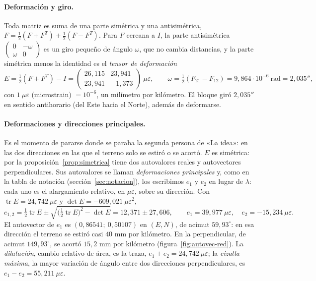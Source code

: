 \paragraph{Deformación y giro.} Toda matriz es suma de una parte simétrica y una
antisimétrica, \(F=\tfrac12(F+F^T)+\tfrac12(F-F^T)\). Para \(F\) cercana a \(I\), la parte
antisimétrica \(\left(\begin{smallmatrix}0&-\omega\\\omega&0\end{smallmatrix}\right)\) es un
giro pequeño de ángulo \(\omega\), que no cambia distancias, y la parte simétrica menos la
identidad es el \emph{tensor de deformación}
\[
  E=\tfrac12(F+F^T)-I=\begin{pmatrix}26{,}115&23{,}941\\23{,}941&-1{,}373\end{pmatrix}\ \mu\varepsilon,
  \qquad
  \omega=\tfrac12(F_{21}-F_{12})=9{,}864\cdot10^{-6}\ \text{rad}=2{,}035'' ,
\]
con \(1\ \mu\varepsilon\) (microstrain) \(=10^{-6}\), un milímetro por kilómetro. El bloque
giró \(2{,}035''\) en sentido antihorario (del Este hacia el Norte), además de deformarse.

\paragraph{Deformaciones y direcciones principales.} Es el momento de pararse donde se paraba
la segunda persona de «La idea»: en las dos direcciones en las que el terreno solo se estiró o
se acortó. \(E\) es simétrica: por la
proposición~\ref{prop:simetrica} tiene dos autovalores reales y autovectores perpendiculares.
Sus autovalores se llaman \emph{deformaciones principales} y, como en la tabla de notación
(sección~\ref{sec:notacion}), los escribimos \(e_1\) y \(e_2\) en lugar de \(\lambda\):
cada uno es el alargamiento relativo, en \(\mu\varepsilon\), sobre su dirección.
Con \(\operatorname{tr}E=24{,}742\ \mu\varepsilon\) y \(\det E=-609{,}021\ \mu\varepsilon^2\),
\[
  e_{1,2}=\tfrac12\operatorname{tr}E\pm\sqrt{\bigl(\tfrac12\operatorname{tr}E\bigr)^2-\det E}
  =12{,}371\pm27{,}606 ,
  \qquad
  e_1=39{,}977\ \mu\varepsilon,\quad e_2=-15{,}234\ \mu\varepsilon .
\]
El autovector de \(e_1\) es \((0{,}86541;\ 0{,}50107)\) en \((E,N)\), de acimut
\(59{,}93^\circ\): en esa dirección el terreno se estiró casi \(40\) mm por kilómetro. En la
perpendicular, de acimut \(149{,}93^\circ\), se acortó \(15{,}2\) mm por kilómetro
(figura~\ref{fig:autovec-red}). La \emph{dilatación}, cambio relativo de área, es la traza,
\(e_1+e_2=24{,}742\ \mu\varepsilon\); la \emph{cizalla máxima}, la mayor variación de ángulo
entre dos direcciones perpendiculares, es \(e_1-e_2=55{,}211\ \mu\varepsilon\).

